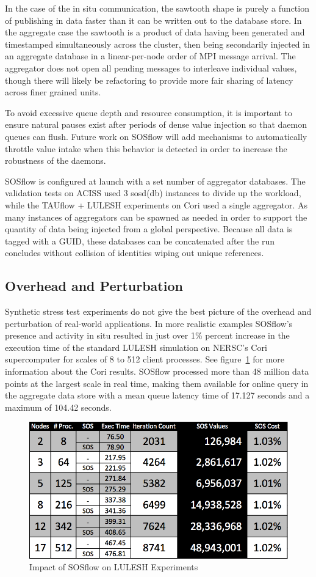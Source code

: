 In the case of the in situ communication, the sawtooth shape is purely
a function of publishing in data faster than it can be written out to
the database store. In the aggregate case the sawtooth is a product of
data having been generated and timestamped simultaneously across the
cluster, then being secondarily injected in an aggregate database in a
linear-per-node order of MPI message arrival.  The aggregator does not
open all pending messages to interleave individual values, though
there will likely be refactoring to provide more fair sharing of
latency across finer grained units.

To avoid excessive queue depth and resource consumption, it is
important to ensure natural pauses exist after periods of dense value
injection so that daemon queues can flush. Future work on SOSflow will
add mechanisms to automatically throttle value intake when this
behavior is detected in order to increase the robustness of the
daemons.

SOSflow is configured at launch with a set number of aggregator
databases.  The validation tests on ACISS used 3 sosd(db) instances to
divide up the workload, while the TAUflow + LULESH experiments on Cori
used a single aggregator. As many instances of aggregators can be spawned
as needed in order to support the quantity of data being injected from
a global perspective. Because all data is tagged with a GUID, these
databases can be concatenated after the run concludes without collision
of identities wiping out unique references.


\subsection{Overhead and Perturbation}

Synthetic stress test experiments do not give the best picture of the
overhead and perturbation of real-world applications. In more
realistic examples SOSflow's presence and activity in situ resulted in
just over 1\% percent increase in the execution time of the standard
LULESH simulation on NERSC's Cori supercomputer for scales of 8 to 512
client processes.  See figure~\ref{cori_results} for more information
about the Cori results.  SOSflow processed more than 48 million data
points at the largest scale in real time, making them available for
online query in the aggregate data store with a mean queue latency
time of 17.127 seconds and a maximum of 104.42 seconds.

\begin{figure}[!t]
\centering
\includegraphics[width=5in]{images/cori_results.png}
\caption{Impact of SOSflow on LULESH Experiments}
\label{cori_results}
\end{figure}


